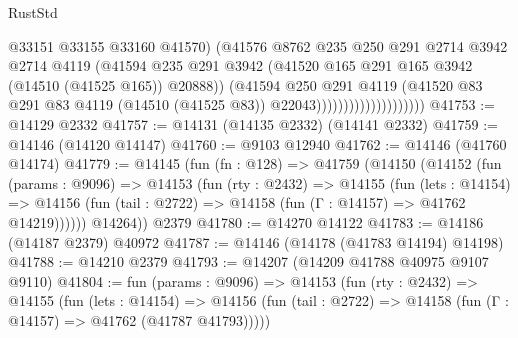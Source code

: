 \begin{lexlean}{RustStd}
\begin{coremodule}
                                        @33151
                                        @33155
                                        @33160
                                        @41570)
                                      (@41576
                                        @8762
                                        @235
                                        @250
                                        @291
                                        @2714
                                        @3942
                                        @2714
                                        @4119
                                        (@41594
                                          @235
                                          @291
                                          @3942
                                          (@41520
                                            @165
                                            @291
                                            @165
                                            @3942
                                            (@14510 (@41525 @165))
                                            @20888))
                                        (@41594
                                          @250
                                          @291
                                          @4119
                                          (@41520
                                            @83
                                            @291
                                            @83
                                            @4119
                                            (@14510 (@41525 @83))
                                            @22043))))))))))))))))))))
@41753 := @14129 @2332
@41757 := @14131 (@14135 @2332) (@14141 @2332)
@41759 := @14146 (@14120 @14147)
@41760 := @9103 @12940
@41762 := @14146 (@41760 @14174)
@41779 := @14145
    (fun (fn : @128) =>
    @41759
      (@14150
        (@14152
          (fun (params : @9096) =>
          @14153
            (fun (rty : @2432) =>
            @14155
              (fun (lets : @14154) =>
              @14156 (fun (tail : @2722) => @14158 (fun (Γ : @14157) => @41762 @14219))))))
        @14264))
    @2379
@41780 := @14270 @14122
@41783 := @14186 (@14187 @2379) @40972
@41787 := @14146 (@14178 (@41783 @14194) @14198)
@41788 := @14210 @2379
@41793 := @14207 (@14209 @41788 @40975 @9107 @9110)
@41804 := fun (params : @9096) =>
  @14153
    (fun (rty : @2432) =>
    @14155
      (fun (lets : @14154) =>
      @14156 (fun (tail : @2722) => @14158 (fun (Γ : @14157) => @41762 (@41787 @41793)))))

\end{coremodule}
\end{lexlean}
